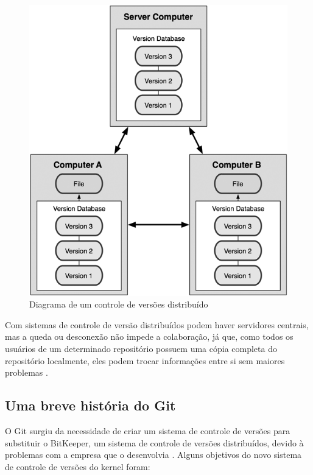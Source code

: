 \begin{figure} [ht]
	\centering
	\includegraphics[scale=0.4]{dist_version_control.png}
	\caption{Diagrama de um controle de versões distribuído \cite[p. 4]{progit}}
	\label{dist_version_control}
\end{figure}

Com sistemas de controle de versão distribuídos podem haver servidores centrais, mas a queda ou desconexão não impede a colaboração, já que, como todos os usuários de um determinado repositório possuem uma cópia completa do repositório localmente, eles podem trocar informações entre si sem maiores problemas \cite[p. 4]{progit}.

\subsection{Uma breve história do Git}

O Git surgiu da necessidade de criar um sistema de controle de versões para substituir o BitKeeper, um sistema de controle de versões distribuídos, devido à problemas com a empresa que o desenvolvia \cite[p. 5]{progit}. Alguns objetivos do novo sistema de controle de versões do kernel foram:


